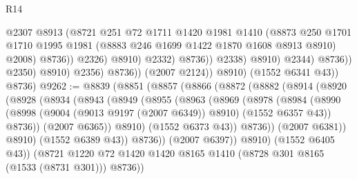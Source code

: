 \begin{lexlean}{R14}
\begin{coremodule}
                                            @2307
                                            @8913
                                            (@8721
                                              @251
                                              @72
                                              @1711
                                              @1420
                                              @1981
                                              @1410
                                              (@8873
                                                @250
                                                @1701
                                                @1710
                                                @1995
                                                @1981
                                                (@8883 @246 @1699 @1422 @1870 @1608 @8913 @8910)
                                                @2008)
                                              @8736))
                                          @2326)
                                        @8910)
                                      @2332)
                                    @8736))
                                @2338)
                              @8910)
                            @2344)
                          @8736))
                      @2350)
                    @8910)
                  @2356)
                @8736))
            (@2007 @2124))
          @8910)
        (@1552 @6341 @43))
      @8736)
@9262 := @8839
    (@8851
      (@8857
        (@8866
          (@8872
            (@8882
              (@8914
                (@8920
                  (@8928
                    (@8934
                      (@8943
                        (@8949
                          (@8955
                            (@8963
                              (@8969
                                (@8978
                                  (@8984
                                    (@8990
                                      (@8998
                                        (@9004 (@9013 @9197 (@2007 @6349)) @8910)
                                        (@1552 @6357 @43))
                                      @8736))
                                  (@2007 @6365))
                                @8910)
                              (@1552 @6373 @43))
                            @8736))
                        (@2007 @6381))
                      @8910)
                    (@1552 @6389 @43))
                  @8736))
              (@2007 @6397))
            @8910)
          (@1552 @6405 @43))
        (@8721 @1220 @72 @1420 @1420 @8165 @1410 (@8728 @301 @8165 (@1533 (@8731 @301))) @8736))

\end{coremodule}
\end{lexlean}
